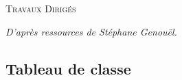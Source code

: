 \documentclass[10pt]{article}
\begin{document}

\begin{center}
\large{\textsc{Travaux Dirigés}}
\end{center}

\vspace{.5cm}
\begin{flushright}
\textit{D'après ressources de Stéphane Genouël.}
\end{flushright}



\subsection*{Tableau de classe}
\setcounter{subparagraph}{0}
\end{document}
